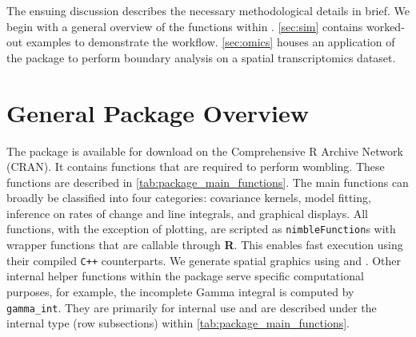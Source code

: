 { The ensuing discussion describes the necessary methodological details in brief. We begin with a general overview of the functions within . \ref{sec:sim} contains worked-out examples to demonstrate the workflow. \ref{sec:omics} houses an application of the package to perform boundary analysis on a spatial transcriptomics dataset.}

{
\section{General Package Overview}
The  package is available for download on the Comprehensive R Archive Network (CRAN). %
It contains functions that are required to perform wombling. These functions are described in \ref{tab:package_main_functions}. The main functions can broadly be classified into four categories: covariance kernels, model fitting, inference on rates of change and line integrals, and graphical displays. All functions, with the exception of plotting, are scripted as \texttt{nimbleFunction}s with wrapper functions that are callable through {\bf R}. This enables fast execution using their compiled \texttt{C++} counterparts. We generate spatial graphics using  \cite[][]{wickham2011ggplot2} and  \cite[][]{MBA}. Other internal helper functions within the package serve specific computational purposes, for example, the incomplete Gamma integral is computed by \texttt{gamma\_int}. They are primarily for internal use and are described under the internal type (row subsections) within \ref{tab:package_main_functions}.  %

}
